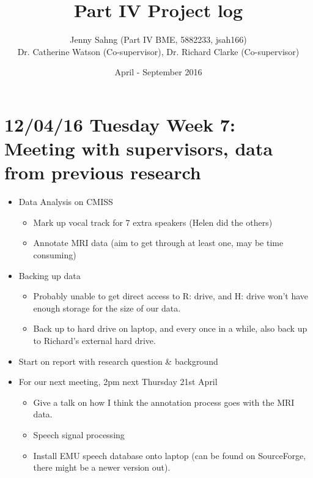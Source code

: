 \documentclass{article}
\title{Part IV Project log}
\author{Jenny Sahng (Part IV BME, 5882233, jsah166)\\
    Dr. Catherine Watson (Co-supervisor), Dr. Richard Clarke (Co-supervisor)}
\date{April - September 2016}
\begin{document}
\maketitle

\section*{12/04/16 Tuesday Week 7: Meeting with supervisors, data from previous research}
\begin{itemize}
    \item Data Analysis on CMISS
    \begin{itemize}
        \item Mark up vocal track for 7 extra speakers (Helen did the others)
    \item Annotate MRI data (aim to get through at least one, may be time consuming)
    \end{itemize}
    \item Backing up data
    \begin{itemize}
        \item Probably unable to get direct access to R: drive, and H: drive won't have enough storage for the size of our data.
        \item Back up to hard drive on laptop, and every once in a while, also back up to Richard's external hard drive.
    \end{itemize}
    \item Start on report with research question \& background
    \item For our next meeting, 2pm next Thursday 21st April
    \begin{itemize}
        \item Give a talk on how I think the annotation process goes with the MRI data.
        \item Speech signal processing
        \item Install EMU speech database onto laptop (can be found on SourceForge, there might be a newer version out).
    \end{itemize}
\end{itemize}
\end{document}
